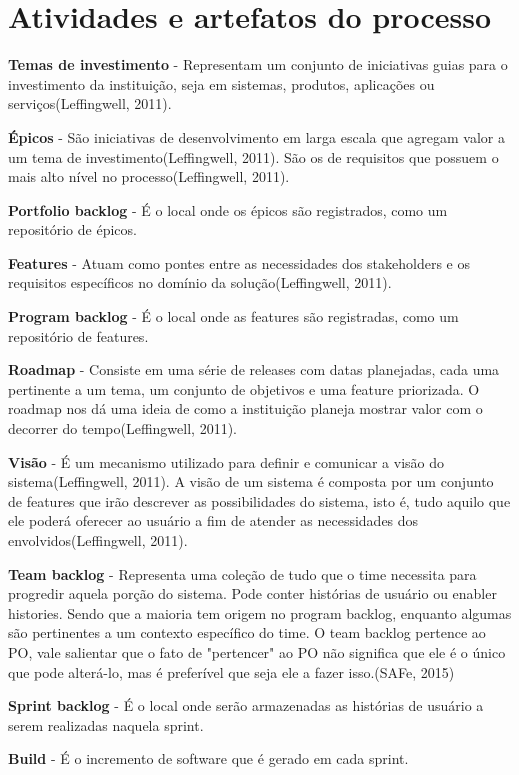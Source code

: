 \section{Atividades e artefatos do processo}
\item \textbf{Temas de investimento} - Representam um conjunto de iniciativas guias para o investimento da instituição, seja em sistemas, produtos, aplicações ou serviços(Leffingwell, 2011).
\item \textbf{Épicos} - São iniciativas de desenvolvimento em larga escala que agregam valor a um tema de investimento(Leffingwell, 2011). São os de requisitos que possuem o mais alto nível no processo(Leffingwell, 2011).
\item \textbf{Portfolio backlog} - É o local onde os épicos são registrados, como um repositório de épicos.
\item \textbf{Features} - Atuam como pontes entre as necessidades dos stakeholders e os requisitos específicos no domínio da solução(Leffingwell, 2011).
\item \textbf{Program backlog} - É o local onde as features são registradas, como um repositório de features.
\item \textbf{Roadmap} - Consiste em uma série de releases com datas planejadas, cada uma pertinente a um tema, um conjunto de objetivos e uma feature priorizada. O roadmap nos dá uma ideia de como a instituição planeja mostrar valor com o decorrer do tempo(Leffingwell, 2011).
\item \textbf{Visão} - É um mecanismo utilizado para definir e comunicar a visão do sistema(Leffingwell, 2011). A visão de um sistema é composta por um conjunto de features que irão descrever as possibilidades do sistema, isto é, tudo aquilo que ele poderá oferecer ao usuário a fim de atender as necessidades dos envolvidos(Leffingwell, 2011).
\item \textbf{Team backlog} - Representa uma coleção de tudo que o time necessita para progredir aquela porção do sistema. Pode conter histórias de usuário ou enabler histories. Sendo que a maioria tem origem no program backlog, enquanto algumas são pertinentes a um contexto específico do time. O team backlog pertence ao PO, vale salientar que o fato de "pertencer" ao PO não significa que ele é o único que pode alterá-lo, mas é preferível que seja ele a fazer isso.(SAFe, 2015)
\item \textbf{Sprint backlog} - É o local onde serão armazenadas as histórias de usuário a serem realizadas naquela sprint.
\item \textbf{Build} - É o incremento de software que é gerado em cada sprint.